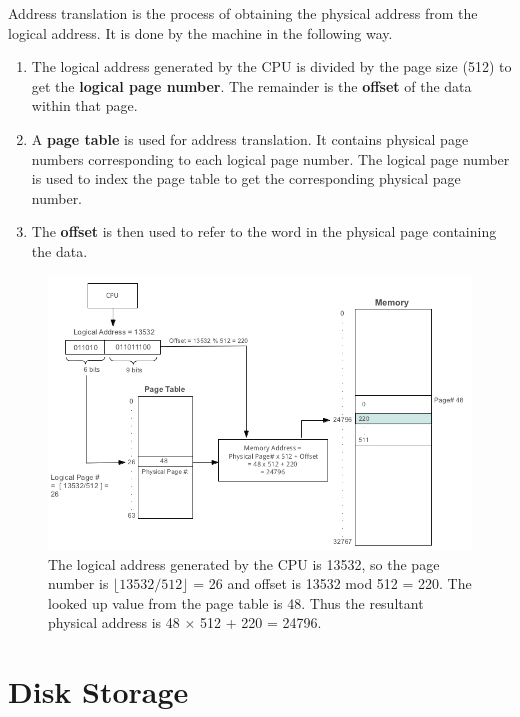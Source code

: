 \documentclass[11pt]{article}
\begin{document}
Address translation is the process of obtaining the physical address from the logical address. It is done by the machine in the following way. 
\begin{enumerate}
\item The logical address generated by the CPU is divided by the page size (512) to get the \textbf{logical page number}. The remainder is the \textbf{offset} of the data within that page.


\item A \textbf{page table} is used for address translation. It contains physical page numbers corresponding to each logical page number. The logical page number is used to index the page table to get the corresponding physical page number.

\item The \textbf{offset} is then used to refer to the word in the physical page containing the data.
\end{enumerate} 
\vspace{0.3in}

\begin{figure}[ht]
	\centering
	\includegraphics[scale=0.58]{address_translation.png}
	\caption{ \small The logical address generated by the CPU is 13532, so the page number is $\lfloor 13532/512 \rfloor$ = 26 and offset is 13532 mod 512 = 220. The looked up value from the page table is 48. Thus the resultant physical address is 48 $\times$ 512 + 220 = 24796.}
	\label{fig:paging}
\end{figure}




\section{Disk Storage}
\end{document}
